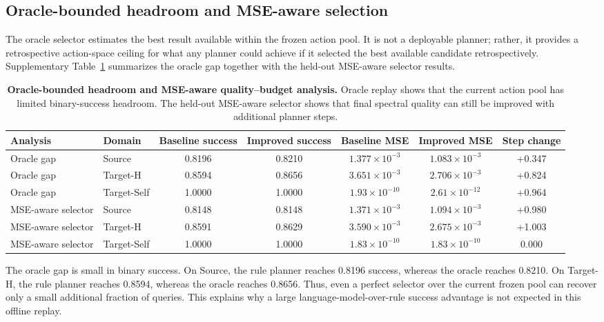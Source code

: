 \documentclass[final,1p,times]{elsarticle}
\begin{document}
\subsection{Oracle-bounded headroom and MSE-aware selection}

The oracle selector estimates the best result available within the frozen action pool. It is not a deployable planner; rather, it provides a retrospective action-space ceiling for what any planner could achieve if it selected the best available candidate retrospectively. Supplementary Table~\ref{tab:si_phase3_oracle_mse} summarizes the oracle gap together with the held-out MSE-aware selector results.

\begin{table}[htbp!]
\centering
\caption{\textbf{Oracle-bounded headroom and MSE-aware quality--budget analysis.}
Oracle replay shows that the current action pool has limited binary-success headroom. The held-out MSE-aware selector shows that final spectral quality can still be improved with additional planner steps.}
\label{tab:si_phase3_oracle_mse}
\footnotesize
\setlength{\tabcolsep}{3.8pt}
\renewcommand{\arraystretch}{1.12}
\begin{tabular}{llccccc}
\toprule
Analysis & Domain & Baseline success & Improved success & Baseline MSE & Improved MSE & Step change \\
\midrule
Oracle gap & Source & 0.8196 & 0.8210 & $1.377\times10^{-3}$ & $1.083\times10^{-3}$ & +0.347 \\
Oracle gap & Target-H & 0.8594 & 0.8656 & $3.651\times10^{-3}$ & $2.706\times10^{-3}$ & +0.824 \\
Oracle gap & Target-Self & 1.0000 & 1.0000 & $1.93\times10^{-10}$ & $2.61\times10^{-12}$ & +0.964 \\
\midrule
MSE-aware selector & Source & 0.8148 & 0.8148 & $1.371\times10^{-3}$ & $1.094\times10^{-3}$ & +0.980 \\
MSE-aware selector & Target-H & 0.8591 & 0.8629 & $3.590\times10^{-3}$ & $2.675\times10^{-3}$ & +1.003 \\
MSE-aware selector & Target-Self & 1.0000 & 1.0000 & $1.83\times10^{-10}$ & $1.83\times10^{-10}$ & 0.000 \\
\bottomrule
\end{tabular}
\end{table}

The oracle gap is small in binary success. On Source, the rule planner reaches 0.8196 success, whereas the oracle reaches 0.8210. On Target-H, the rule planner reaches 0.8594, whereas the oracle reaches 0.8656. Thus, even a perfect selector over the current frozen pool can recover only a small additional fraction of queries. This explains why a large language-model-over-rule success advantage is not expected in this offline replay.
\end{document}

